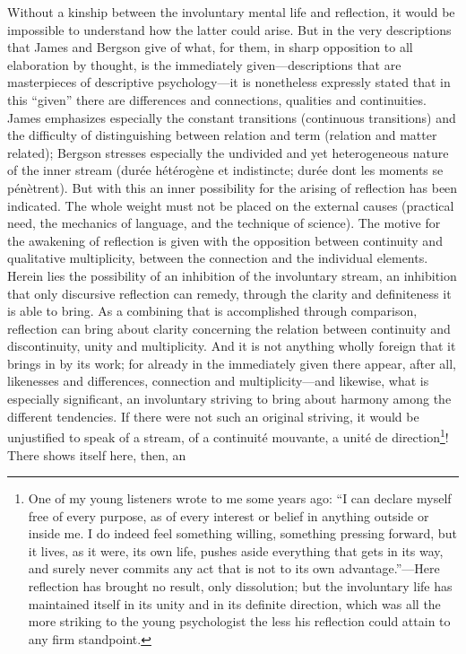 \documentclass[12pt,a4paper]{book}
\newcommand{\opage}[1]{\marginnote{\footnotesize\textit{[#1]}}}
\begin{document}
Without a kinship between the involuntary mental life and reflection, it
would be impossible to understand how the latter could arise. But in the
very descriptions that James and Bergson give of what, for them, in
sharp opposition to all elaboration by thought, is the immediately
given---descriptions that are masterpieces of descriptive
psychology---it is nonetheless expressly stated that in this ``given''
there are differences and connections, qualities and continuities. James
emphasizes especially the constant transitions (continuous transitions)
and the difficulty of distinguishing between relation and term (relation
and matter related); Bergson stresses especially the undivided and yet
heterogeneous nature of the inner stream (durée hétérogène et
indistincte; durée dont les moments se pénètrent). But with this an
inner possibility for the arising of reflection has been indicated. The
whole weight must not be placed on the external causes (practical need,
the mechanics of language, and the technique of science). The motive for
the awakening of reflection is given with the opposition between
continuity and qualitative multiplicity, between the connection and the
individual elements. Herein lies the possibility of an inhibition of the
involuntary stream, an inhibition that only discursive reflection can
remedy, through the clarity and definiteness it is able to bring. As a
combining that is accomplished through comparison, reflection can bring
about clarity concerning the relation between continuity and
discontinuity, unity and multiplicity. And it is not anything wholly
foreign that it brings in by its work; for already in the immediately
given there appear, after all, likenesses and differences, connection
and multiplicity---and likewise, what \opage{10}is especially significant, an
involuntary striving to bring about harmony among the different
tendencies. If there were not such an original striving, it would be
unjustified to speak of a stream, of a continuité mouvante, a unité de
direction\footnote{One of my young listeners wrote to me some years ago:
``I can declare myself free of every purpose, as of every interest or
belief in anything outside or inside me. I do indeed feel something
willing, something pressing forward, but it lives, as it were, its own
life, pushes aside everything that gets in its way, and surely never
commits any act that is not to its own advantage.''---Here reflection
has brought no result, only dissolution; but the involuntary life has
maintained itself in its unity and in its definite direction, which was
all the more striking to the young psychologist the less his reflection
could attain to any firm standpoint.}! There shows itself here, then, an
\end{document}
